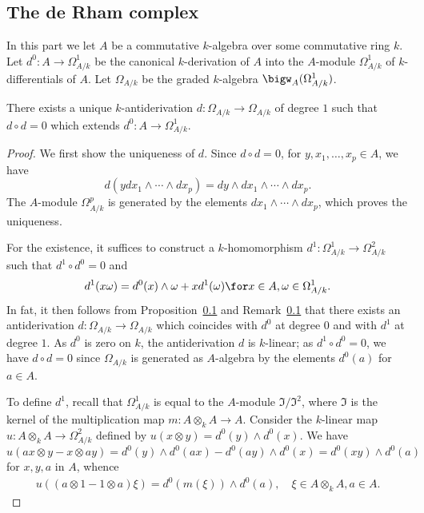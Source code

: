 \subsection{The de Rham complex}
In this part we let $A$ be a commutative $k$-algebra over some commutative ring $k$. Let $d^0:A\to\Omega_{A/k}^1$ be the canonical $k$-derivation of $A$ into the $A$-module $\Omega_{A/k}^1$ of $k$-differentials of $A$. Let $\Omega_{A/k}$ be the graded $k$-algebra $\bigw_A(\Omega_{A/k}^1)$.
\begin{proposition}\label{module complex de Rham antiderivation exist}
There exists a unique $k$-antiderivation $d:\Omega_{A/k}\to\Omega_{A/k}$ of degree $1$ such that $d\circ d=0$ which extends $d^0:A\to\Omega_{A/k}^1$.
\end{proposition}
\begin{proof}
We first show the uniqueness of $d$. Since $d\circ d=0$, for $y,x_1,\dots,x_p\in A$, we have
\[d(y dx_1\wedge\cdots\wedge dx_p)=dy\wedge dx_1\wedge\cdots\wedge dx_p.\]
The $A$-module $\Omega_{A/k}^p$ is generated by the elements $dx_1\wedge\cdots\wedge dx_p$, which proves the uniqueness.\par
For the existence, it suffices to construct a $k$-homomorphism $d^1:\Omega_{A/k}^1\to\Omega_{A/k}^2$ such that $d^1\circ d^0=0$ and
\begin{equation}\label{module complex de Rham antiderivation exist-1}
d^1(x\omega)=d^0(x)\wedge\omega+xd^1(\omega)\for x\in A,\omega\in\Omega_{A/k}^1.
\end{equation}
In fat, it then follows from Proposition~\ref{} and Remark~\ref{} that there exists an antiderivation $d:\Omega_{A/k}\to\Omega_{A/k}$ which coincides with $d^0$ at degree $0$ and with $d^1$ at degree $1$. As $d^0$ is zero on $k$, the antiderivation $d$ is $k$-linear; as $d^1\circ d^0=0$, we have $d\circ d=0$ since $\Omega_{A/k}$ is generated as $A$-algebra by the elements $d^0(a)$ for $a\in A$.\par
To define $d^1$, recall that $\Omega_{A/k}^1$ is equal to the $A$-module $\mathfrak{I}/\mathfrak{I}^2$, where $\mathfrak{I}$ is the kernel of the multiplication map $m:A\otimes_kA\to A$. Consider the $k$-linear map $u:A\otimes_kA\to\Omega_{A/k}^2$ defined by $u(x\otimes y)=d^0(y)\wedge d^0(x)$. We have
\[u(ax\otimes y-x\otimes ay)=d^0(y)\wedge d^0(ax)-d^0(ay)\wedge d^0(x)=d^0(xy)\wedge d^0(a)\]
for $x,y,a$ in $A$, whence
\begin{align}\label{module complex de Rham antiderivation exist-2}
u((a\otimes 1-1\otimes a)\xi)=d^0(m(\xi))\wedge d^0(a),\quad \xi\in A\otimes_kA,a\in A.

\end{align}
\end{proof}
